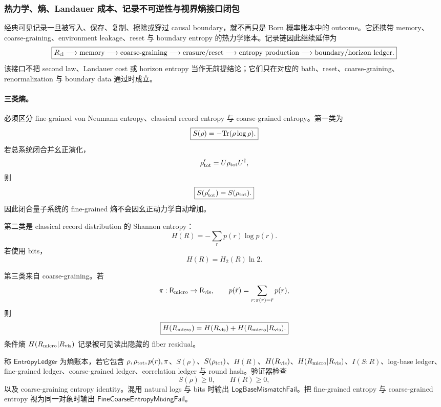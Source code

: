 \subsubsection{热力学、熵、Landauer 成本、记录不可逆性与视界熵接口闭包}\label{subsubsec:typed-address-biaxial-completion-thermodynamic-record-horizon-entropy-closure}
经典可见记录一旦被写入、保存、复制、擦除或穿过 causal boundary，就不再只是 Born 概率账本中的 outcome。它还携带 memory、coarse-graining、environment leakage、reset 与 boundary entropy 的热力学账本。记录链因此继续延伸为
\[
\boxed{
R_{\rm cl}
\longrightarrow
\text{memory}
\longrightarrow
\text{coarse-graining}
\longrightarrow
\text{erasure/reset}
\longrightarrow
\text{entropy production}
\longrightarrow
\text{boundary/horizon ledger}.
}
\]
该接口不把 second law、Landauer cost 或 horizon entropy 当作无前提结论；它们只在对应的 bath、reset、coarse-graining、renormalization 与 boundary data 通过时成立。

\paragraph{三类熵。}
必须区分 fine-grained von Neumann entropy、classical record entropy 与 coarse-grained entropy。第一类为
\[
\boxed{
S(\rho)=-{\rm Tr}(\rho\log\rho).
}
\]
若总系统闭合并幺正演化，
\[
\rho'_{\rm tot}=U\rho_{\rm tot}U^\dagger,
\]
则
\[
\boxed{
S(\rho'_{\rm tot})=S(\rho_{\rm tot}).
}
\]
因此闭合量子系统的 fine-grained 熵不会因幺正动力学自动增加。

第二类是 classical record distribution 的 Shannon entropy：
\[
\boxed{
H(R)=-\sum_rp(r)\log p(r).
}
\]
若使用 bits，
\[
H(R)=H_2(R)\ln2.
\]

第三类来自 coarse-graining。若
\[
\pi:\mathsf R_{\rm micro}\to\mathsf R_{\rm vis},
\qquad
p(\bar r)=\sum_{r:\pi(r)=\bar r}p(r),
\]
则
\[
\boxed{
H(R_{\rm micro})
=
H(R_{\rm vis})+H(R_{\rm micro}|R_{\rm vis}).
}
\]
条件熵 \(H(R_{\rm micro}|R_{\rm vis})\) 记录被可见读出隐藏的 fiber residual。

\begin{definition}[熵账本]\label{def:typed-address-biaxial-completion-entropy-ledger}
称 \(\mathsf{EntropyLedger}\) 为熵账本，若它包含 \(\rho,\rho_{\rm tot},p(r),\pi\)、\(S(\rho)\)、\(S(\rho_{\rm tot})\)、\(H(R)\)、\(H(R_{\rm vis})\)、\(H(R_{\rm micro}|R_{\rm vis})\)、\(I(S:R)\)、log-base ledger、fine-grained ledger、coarse-grained ledger、correlation ledger 与 round hash。验证器检查
\[
S(\rho)\ge0,\qquad H(R)\ge0,
\]
以及 coarse-graining entropy identity。混用 natural logs 与 bits 时输出 \(\mathsf{LogBaseMismatchFail}\)。把 fine-grained entropy 与 coarse-grained entropy 视为同一对象时输出 \(\mathsf{FineCoarseEntropyMixingFail}\)。
\end{definition}

